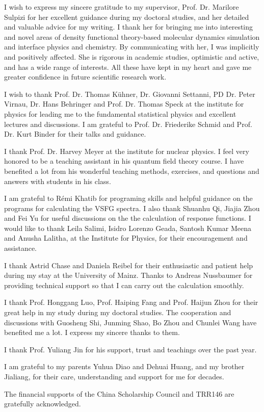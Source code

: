 \documentclass[
11pt, %
english, %
singlespacing, %
headsepline, %
]{MastersDoctoralThesis} %
\begin{document}
\begin{acknowledgements}
\addchaptertocentry{\acknowledgementname} %
I wish to express my sincere gratitude to my supervisor,
Prof. Dr. Marilore Sulpizi for her excellent guidance during my doctoral studies, and her detailed and valuable advice for my writing.
I thank her for bringing me into interesting and novel areas of density functional theory-based molecular dynamics simulation 
and interface physics and chemistry. By communicating with her, I was implicitly and positively affected. 
She is rigorous in academic studies, optimistic and active, and has a wide range of interests. 
All these have kept in my heart and gave me greater confidence in future scientific research work.

%
I wish to thank Prof. Dr. Thomas Kühner, Dr. Giovanni Settanni, PD Dr. Peter
Virnau, Dr. Hans Behringer and Prof. Dr. Thomas Speck at the institute for
physics for leading me to the fundamental statistical physics and excellent lectures
and discussions. I am grateful to Prof. Dr. Friederike Schmid and Prof. Dr. Kurt
Binder for their talks and guidance.

%
I thank Prof. Dr. Harvey Meyer at the institute for nuclear physics. 
I feel very honored to be a teaching assistant in his quantum field theory course. I have benefited a lot from his wonderful teaching methods, exercises, and questions and answers with students in his class.

%
I am grateful to R\'emi Khatib for programing skills and helpful guidance on
the programs for calculating the VSFG spectra. I also thank Shuanhu Qi, Jiajia Zhou and Fei Yu for useful discussions 
on the the calculation of response functions. I would like to
thank Leila Salimi, Isidro Lorenzo Geada, Santosh Kumar Meena and Anusha Lalitha, 
at the Institute for Physics, for their encouragement and assistance.

%
I thank Astrid Chase and Daniela Reibel for their enthusiastic and patient help during my stay at the University of Mainz. Thanks to Andreas Nussbaumer  for providing technical support so that I can carry out the calculation smoothly.

%
I thank Prof. Honggang Luo, Prof. Haiping Fang and Prof. Haijun Zhou for their great help in my study during my doctoral studies. 
The cooperation and discussions with Guosheng Shi, Junming Shao, Bo Zhou and Chunlei Wang have benefited me a lot. 
I express my sincere thanks to them.

%
I thank Prof. Yuliang Jin for his support, trust and teachings over the past year.

%
I am grateful to my parents Yuhua Diao and Dehuai Huang, and my brother Jialiang, for their care, 
understanding and support for me for decades. 

%
The financial supports of the China Scholarship Council and TRR146 are gratefully acknowledged.
\end{acknowledgements}
\end{document}
